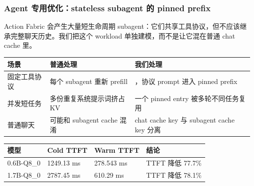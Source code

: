 \begin{frame}
  \frametitle{Agent 专用优化：stateless subagent 的 pinned prefix}
  \small
  Action Fabric 会产生大量短生命周期 subagent：它们共享工具协议，但不应该继承完整聊天历史。我们把这个 workload 单独建模，而不是让它混在普通 chat cache 里。

  \vspace{0.35em}
  \scriptsize
  \begin{tabularx}{\textwidth}{p{}Y Y}
    \toprule
    场景 & 普通处理 & 我们处理 \\
    \midrule
    固定工具协议 & 每个 subagent 重新 prefill & ，协议 prompt 进入 pinned prefix \\
    并发短任务 & 多份重复系统提示词挤占 KV & 一个 pinned entry 被多轮不同任务复用 \\
    普通聊天 & 可能和 subagent cache 混淆 & chat cache key 与 subagent cache key 分离 \\
    \bottomrule
  \end{tabularx}

  \vspace{0.55em}
  \scriptsize
  \begin{tabularx}{\textwidth}{p{}p{}p{}Y}
    \toprule
    模型 & Cold TTFT & Warm TTFT & 结论 \\
    \midrule
    0.6B-Q8\_0 & 1249.13 ms & 278.543 ms & TTFT 降低 77.7\% \\
    1.7B-Q8\_0 & 2787.45 ms & 610.29 ms & TTFT 降低 78.1\% \\
    \bottomrule
  \end{tabularx}
\end{frame}

